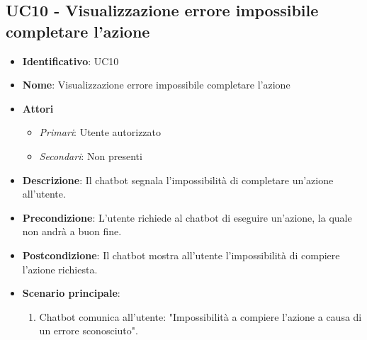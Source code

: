 \subsection{UC10 - Visualizzazione errore impossibile completare l'azione}
\begin{itemize}
	\item \textbf{Identificativo}: UC10
	\item \textbf{Nome}:  Visualizzazione errore impossibile completare l'azione
	\item \textbf{Attori}
	\begin{itemize} 
		\item \textit{Primari}: Utente autorizzato
		\item \textit{Secondari}: Non presenti
	\end{itemize}
	\item \textbf{Descrizione}: Il chatbot segnala l'impossibilità di completare un'azione all'utente.
	\item \textbf{Precondizione}: L'utente richiede al chatbot di eseguire un'azione, la quale non andrà a buon fine.
	\item \textbf{Postcondizione}: Il chatbot mostra all'utente l'impossibilità di compiere l'azione richiesta.
	\item \textbf{Scenario principale}: \begin{enumerate}
		\item Chatbot comunica all'utente: "Impossibilità a compiere l'azione a causa di un errore sconosciuto".
	\end{enumerate}
\end{itemize}